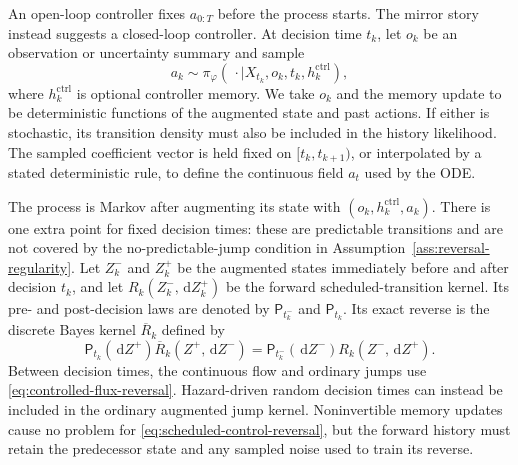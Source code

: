 \documentclass[10pt]{article}
\theoremstyle{definition}
\theoremstyle{remark}
\newcommand{\dd}{\,\mathrm{d}}
\begin{document}
An open-loop controller fixes $a_{0:T}$ before the process starts.  The
mirror story instead suggests a closed-loop controller.  At decision time
$t_k$, let $o_k$ be an observation or uncertainty summary and sample
\begin{equation}
  a_k\sim\pi_\varphi(\,\cdot\mid X_{t_k},o_k,t_k,h_k^{\mathrm{ctrl}}),
  \label{eq:control-policy}
\end{equation}
where $h_k^{\mathrm{ctrl}}$ is optional controller memory.  We take $o_k$
and the memory update to be deterministic functions of the augmented state
and past actions.  If either is stochastic, its transition density must also
be included in the history likelihood.  The sampled coefficient vector is
held fixed on $[t_k,t_{k+1})$, or interpolated by a stated deterministic
rule, to define the continuous field $a_t$ used by the ODE.

The process is Markov after augmenting its state with
$(o_k,h_k^{\mathrm{ctrl}},a_k)$.  There is one extra point for fixed decision
times: these are predictable transitions and are not covered by the
no-predictable-jump condition in
Assumption~\ref{ass:reversal-regularity}.  Let $Z_k^-$ and $Z_k^+$ be the
augmented states immediately before and after decision $t_k$, and let
$R_k(Z_k^-,\dd Z_k^+)$ be the forward scheduled-transition kernel.  Its
pre- and post-decision laws are denoted by
$\mathsf P_{t_k^-}$ and $\mathsf P_{t_k}$.  Its exact reverse is the
discrete Bayes kernel $\overline R_k$ defined by
\begin{equation}
  \mathsf P_{t_k}(\dd Z^+)\overline R_k(Z^+,\dd Z^-)
  =\mathsf P_{t_k^-}(\dd Z^-)R_k(Z^-,\dd Z^+).
  \label{eq:scheduled-control-reversal}
\end{equation}
Between decision times, the continuous flow and ordinary jumps use
\eqref{eq:controlled-flux-reversal}.  Hazard-driven random decision times
can instead be included in the ordinary augmented jump kernel.
Noninvertible memory updates cause no problem for
\eqref{eq:scheduled-control-reversal}, but the forward history must retain
the predecessor state and any sampled noise used to train its reverse.
\end{document}
